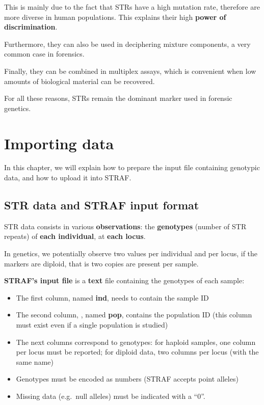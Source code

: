 \documentclass[
]{book}
\begin{document}
This is mainly due to the fact that STRs have a high mutation rate, therefore
are more diverse in human populations. This explains their high \textbf{power of discrimination}.

Furthermore, they can also be used in deciphering mixture components, a very common
case in forensics.

Finally, they can be combined in multiplex assays, which is convenient when low
amounts of biological material can be recovered.

For all these reasons, STRs remain the dominant marker used in forensic genetics.

\hypertarget{importing-data}{%
\chapter{Importing data}\label{importing-data}}

In this chapter, we will explain how to prepare the input file containing
genotypic data, and how to upload it into STRAF.

\hypertarget{str-data-and-straf-input-format}{%
\section{STR data and STRAF input format}\label{str-data-and-straf-input-format}}

STR data consists in various \textbf{observations}: the \textbf{genotypes} (number of STR repeats)
of \textbf{each individual}, at \textbf{each locus}.

In genetics, we potentially observe two values per individual and per locus, if the
markers are diploid, that is two copies are present per sample.

\textbf{STRAF's input file} is a \textbf{text} file containing the genotypes of each sample:

\begin{itemize}
\item
  The first column, named \textbf{ind}, needs to contain the sample ID
\item
  The second column, , named \textbf{pop}, contains the population ID (this column must exist even if a single population is studied)
\item
  The next columns correspond to genotypes: for haploid samples, one column per locus must be reported; for diploid data, two columns per locus (with the same name)
\item
  Genotypes must be encoded as numbers (STRAF accepts point alleles)
\item
  Missing data (e.g.~null alleles) must be indicated with a ``0''.
\end{itemize}
\end{document}
